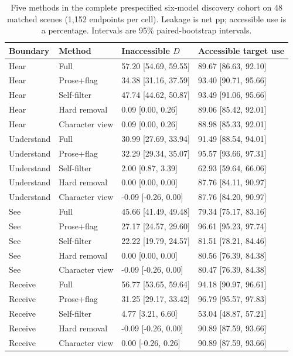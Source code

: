 \documentclass[11pt]{article}
\begin{document}
\begin{table}[t]
\centering\small
\begin{lrbox}{\OCtable}\begin{tabular}{@{}llll@{}}
\toprule
Boundary & Method & Inaccessible $D$ & Accessible target use\\
\midrule
Hear & Full & 57.20 [54.69, 59.55] & 89.67 [86.63, 92.10]\\
Hear & Prose+flag & 34.38 [31.16, 37.59] & 93.40 [90.71, 95.66]\\
Hear & Self-filter & 47.74 [44.62, 50.87] & 93.49 [91.06, 95.66]\\
Hear & Hard removal & 0.09 [0.00, 0.26] & 89.06 [85.42, 92.01]\\
Hear & Character view & 0.09 [0.00, 0.26] & 88.98 [85.33, 92.01]\\
Understand & Full & 30.99 [27.69, 33.94] & 91.49 [88.54, 94.01]\\
Understand & Prose+flag & 32.29 [29.34, 35.07] & 95.57 [93.66, 97.31]\\
Understand & Self-filter & 2.00 [0.87, 3.39] & 62.93 [59.64, 66.06]\\
Understand & Hard removal & 0.00 [0.00, 0.00] & 87.76 [84.11, 90.97]\\
Understand & Character view & -0.09 [-0.26, 0.00] & 87.76 [84.20, 90.97]\\
See & Full & 45.66 [41.49, 49.48] & 79.34 [75.17, 83.16]\\
See & Prose+flag & 27.17 [24.57, 29.60] & 96.61 [95.23, 97.74]\\
See & Self-filter & 22.22 [19.79, 24.57] & 81.51 [78.21, 84.46]\\
See & Hard removal & 0.00 [0.00, 0.00] & 80.56 [76.39, 84.38]\\
See & Character view & -0.09 [-0.26, 0.00] & 80.47 [76.39, 84.38]\\
Receive & Full & 56.77 [53.65, 59.64] & 94.18 [90.97, 96.61]\\
Receive & Prose+flag & 31.25 [29.17, 33.42] & 96.79 [95.57, 97.83]\\
Receive & Self-filter & 4.77 [3.21, 6.60] & 53.04 [48.87, 57.21]\\
Receive & Hard removal & -0.09 [-0.26, 0.00] & 90.89 [87.59, 93.66]\\
Receive & Character view & 0.00 [-0.26, 0.26] & 90.89 [87.59, 93.66]\\
\bottomrule
\end{tabular}\end{lrbox}
\ifdim\wd\OCtable>\linewidth\PackageError{access-paper}{Table tab:discoverymethods exceeds its column}{Revise the table layout.}\fi
\usebox{\OCtable}
\caption{Five methods in the complete prespecified six-model discovery cohort on 48 matched scenes (1,152 endpoints per cell). Leakage is net pp; accessible use is a percentage. Intervals are 95\% paired-bootstrap intervals.}
\label{tab:discoverymethods}
\end{table}
\end{document}
